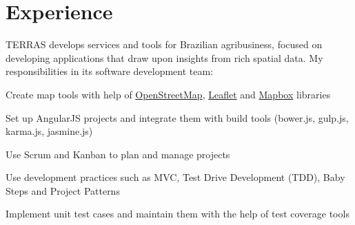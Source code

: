 \documentclass[]{joaosoares-resume}
\begin{document}
\hfill
\begin{minipage}[t]{0.64\textwidth}

\section{Experience}
{\justifying TERRAS develops services and tools for Brazilian agribusiness, focused on developing applications that draw upon insights from rich spatial data. My responsibilities in its software development team:\par} 
\sectionsep
\begin{tightemize}
\item Create map tools with help of \href{https://www.openstreetmap.org}{OpenStreetMap}, \href{http://leafletjs.com}{Leaflet} and \href{https://www.mapbox.com}{Mapbox} libraries 
\item Set up AngularJS projects and integrate them with build tools (bower.js, gulp.js, karma.js, jasmine.js)
\item Use Scrum and Kanban to plan and manage projects
\item Use development practices such as MVC, Test Drive Development (TDD), Baby Steps and Project Patterns
\item Implement unit test cases and maintain them with the help of test coverage tools
\end{tightemize}

\sectionsep


\end{minipage}
\end{document}

